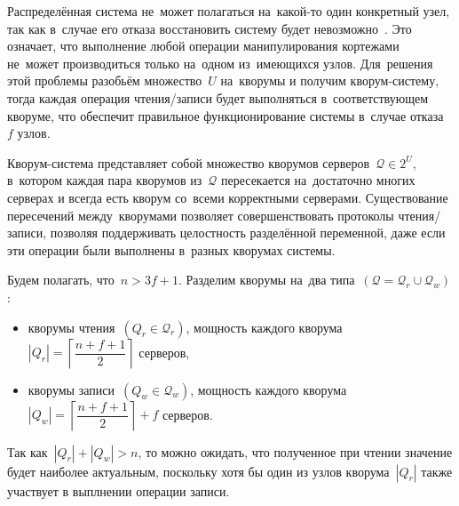 Распределённая система не~может полагаться на~какой-то один конкретный узел, так как в~случае его отказа восстановить систему будет невозможно~\autocite{Kleppman}. Это означает, что выполнение любой операции манипулирования кортежами не~может производиться только на~одном из~имеющихся узлов. Для~решения этой проблемы разобьём множество~$U$ на~кворумы и получим кворум-систему, тогда каждая операция чтения/записи будет выполняться в~соответствующем кворуме, что обеспечит правильное функционирование системы в~случае отказа~$f$ узлов.

Кворум-система представляет собой множество кворумов серверов~$\mathcal{Q} \in 2^{U}$, в~котором каждая пара кворумов из~$\mathcal{Q}$ пересекается на~достаточно многих серверах и всегда есть кворум со~всеми корректными серверами. Существование пересечений между~кворумами позволяет совершенствовать протоколы чтения/записи, позволяя поддерживать целостность разделённой переменной, даже если эти операции были выполнены в~разных кворумах системы.

Будем полагать, что~$n > 3f + 1$. Разделим кворумы на~два типа~$(\mathcal{Q} = \mathcal{Q}_r \cup \mathcal{Q}_w)$:
\begin{itemize}
	\item кворумы чтения~$(Q_r \in \mathcal{Q}_r)$, мощность каждого кворума ~$|Q_r| = \left\lceil \dfrac{n+f+1}{2} \right\rceil$ серверов,
	\item кворумы записи~$(Q_w \in \mathcal{Q}_w)$, мощность каждого кворума~$|Q_w| = \left\lceil \dfrac{n+f+1}{2} \right\rceil + f$ серверов.
\end{itemize}
Так как~$|Q_r| + |Q_w| > n$, то можно ожидать, что полученное при чтении значение  будет наиболее актуальным, поскольку хотя бы один из узлов кворума~$|Q_r|$ также участвует в выплнении операции записи.

